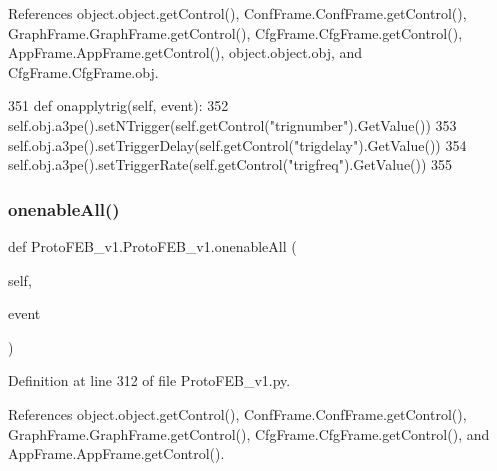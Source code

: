 References object.\+object.\+get\+Control(), Conf\+Frame.\+Conf\+Frame.\+get\+Control(), Graph\+Frame.\+Graph\+Frame.\+get\+Control(), Cfg\+Frame.\+Cfg\+Frame.\+get\+Control(), App\+Frame.\+App\+Frame.\+get\+Control(), object.\+object.\+obj, and Cfg\+Frame.\+Cfg\+Frame.\+obj.


\begin{DoxyCode}
351     \textcolor{keyword}{def }onapplytrig(self, event):
352         self.obj.a3pe().setNTrigger(self.getControl(\textcolor{stringliteral}{"trignumber"}).GetValue())
353         self.obj.a3pe().setTriggerDelay(self.getControl(\textcolor{stringliteral}{"trigdelay"}).GetValue())
354         self.obj.a3pe().setTriggerRate(self.getControl(\textcolor{stringliteral}{"trigfreq"}).GetValue())
355 
\end{DoxyCode}
\mbox{\label{classProtoFEB__v1_1_1ProtoFEB__v1_ad7f0700c99d68f8d6fb83d413f22f6ca}} 
\subsubsection{\texorpdfstring{onenable\+All()}{onenableAll()}}
{\footnotesize\ttfamily def Proto\+F\+E\+B\+\_\+v1.\+Proto\+F\+E\+B\+\_\+v1.\+onenable\+All (\begin{DoxyParamCaption}\item[{}]{self,  }\item[{}]{event }\end{DoxyParamCaption})}



Definition at line 312 of file Proto\+F\+E\+B\+\_\+v1.\+py.



References object.\+object.\+get\+Control(), Conf\+Frame.\+Conf\+Frame.\+get\+Control(), Graph\+Frame.\+Graph\+Frame.\+get\+Control(), Cfg\+Frame.\+Cfg\+Frame.\+get\+Control(), and App\+Frame.\+App\+Frame.\+get\+Control().



